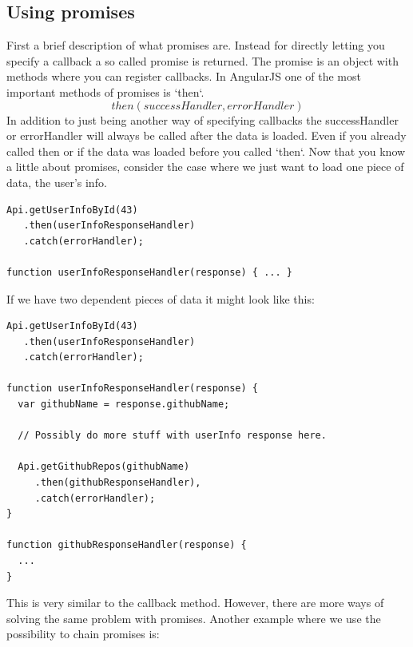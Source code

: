 \documentclass[a4paper,12pt]{article}
\begin{document}
\subsection{Using promises}
First a brief description of what promises are. Instead for directly letting you specify a callback a so called promise is returned. The promise is an object with methods where you can register callbacks.
In AngularJS one of the most important methods of promises is `then`.
\[ then(successHandler, errorHandler) \]
In addition to just being another way of specifying callbacks the successHandler or errorHandler will always be called after the data is loaded. 
Even if you already called then or if the data was loaded before you called `then`. 
Now that you know a little about promises, consider the case where we just want to load one piece of data, the user's info.

\begin{lstlisting}[caption=Code showing how we can load the user's info with promises, frame=single]
Api.getUserInfoById(43)
   .then(userInfoResponseHandler)
   .catch(errorHandler);

function userInfoResponseHandler(response) { ... }
\end{lstlisting}
\clearpage
If we have two dependent pieces of data it might look like this:

\begin{lstlisting}[caption={Code showing an approach using promises where we are loading two pieces of data, where the second is dependent on the first}, frame=single]
Api.getUserInfoById(43)
   .then(userInfoResponseHandler)
   .catch(errorHandler);

function userInfoResponseHandler(response) {
  var githubName = response.githubName;

  // Possibly do more stuff with userInfo response here.

  Api.getGithubRepos(githubName)
     .then(githubResponseHandler), 
     .catch(errorHandler);
}

function githubResponseHandler(response) {
  ...
}
\end{lstlisting}
This is very similar to the callback method. However, there are more ways of solving the same problem with promises.
Another example where we use the possibility to chain promises is:
\end{document}
